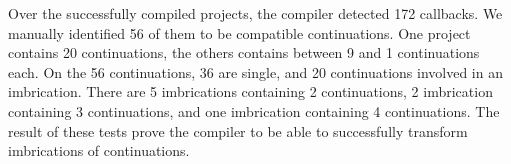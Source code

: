 Over the successfully compiled projects, the compiler detected 172 callbacks.
We manually identified 56 of them to be compatible continuations.
One project contains 20 continuations, the others contains between 9 and 1 continuations each.
On the 56 continuations, 36 are single, and 20 continuations involved in an imbrication.
There are 5 imbrications containing 2 continuations, 2 imbrication containing 3 continuations, and one imbrication containing 4 continuations.
The result of these tests prove the compiler to be able to successfully transform imbrications of continuations.



































